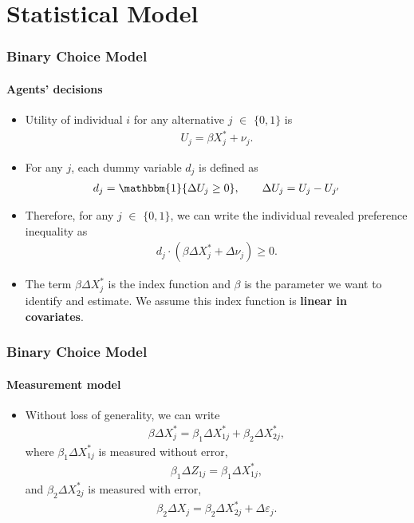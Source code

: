 \section{Statistical Model}
\begin{frame}
\frametitle{Binary Choice Model}
\framesubtitle{Agents' decisions}

\begin{itemize}
	\item Utility of individual $i$ for any alternative $j$ $\in$ $\{0,1\}$ is
	\begin{align*}
	U_{j}=\beta X^{*}_{j} + \nu_{j}.
	\end{align*}
	\item For any $j$, each dummy variable $d_{j}$ is defined as
	\begin{align*}
	d_{j} = \mathbbm{1}\{\Delta U_{j}\geq 0\},\qquad\Delta U_{j} = U_{j}-U_{j'}
	\end{align*}
	\item Therefore, for any $j$ $\in$ $\{0,1\}$, we can write the individual revealed preference inequality as
	\begin{align*}
	d_{j} \cdot (\beta\Delta X^{*}_{j}+\Delta\nu_{j})\geq 0.
	\end{align*}
	\item The term $\beta\Delta X^{*}_{j}$ is the index function and $\beta$ is the parameter we want to identify and estimate. We assume this index function is \textbf{linear in covariates}.
\end{itemize}
\end{frame}
\begin{frame}
\frametitle{Binary Choice Model}
\framesubtitle{Measurement model}

\begin{itemize}
	\item Without loss of generality, we can write 
	\begin{align*}
	\beta\Delta X^{*}_{j} = \beta_{1}\Delta X^{*}_{1j} + \beta_{2}\Delta X^{*}_{2j},
	\end{align*}
	where $\beta_{1}\Delta X^{*}_{1j}$ is measured without error,
	\begin{align*}
	\beta_{1}\Delta Z_{1j} = \beta_{1}\Delta X^{*}_{1j},
	\end{align*}
	and $\beta_{2}\Delta X^{*}_{2j}$ is measured with error,
	\begin{align*}
	\beta_{2}\Delta X_{j} = \beta_{2}\Delta X^{*}_{2j}+\Delta\varepsilon_{j}.
	\end{align*}
\end{itemize}
\end{frame}

